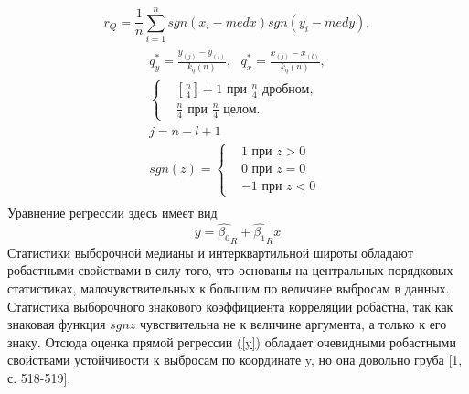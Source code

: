 \documentclass[a4paper,14pt]{article}
\begin{document}
	\begin{equation}
		r_{Q} = \frac{1}{n}\sum_{i=1}^{n}{sgn(x_{i} - med x)sgn(y_{i} - med y)},
		\label{r_Q}
	\end{equation}
	\begin{multline}
		\\
		q^{*}_{y} = \frac{y_{(j)} -y_{(l)}}{k_{q}(n)},~~~
		q^{*}_{x} = \frac{x_{(j)} - x_{(l)}}{k_{q}(n)}, \\ 
		\begin{cases}
			& [\frac{n}{4}] + 1 \text{ при } \frac{n}{4} \text{ дробном, } \\ 
			& \frac{n}{4} \text{ при } \frac{n}{4} \text{ целом. }
		\end{cases}\\
		j = n - l + 1\\
		sgn(z) = \begin{cases}
			& 1 \text{ при } z > 0 \\ 
			& 0 \text{ при } z = 0 \\
			& -1 \text{ при } z < 0
		\end{cases}\\
		\label{q*}        
	\end{multline}
	Уравнение регрессии здесь имеет вид 
	\begin{equation}
		y = \hat{\beta_{0}}_{R} +  \hat{\beta_{1}}_{R}x
		\label{y}
	\end{equation}
	Статистики выборочной медианы и интерквартильной широты обладают робастными свойствами в силу того, что основаны на центральных порядковых статистиках, малочувствительных к большим по величине выбросам в данных. Статистика выборочного знакового коэффициента корреляции робастна, так как знаковая функция $sgn z$ чувствительна не к величине аргумента, а только к его знаку. Отсюда оценка прямой регрессии (\ref{y}) обладает очевидными робастными свойствами устойчивости к выбросам по координате y, но она довольно груба [1, с. 518-519].
\end{document}
